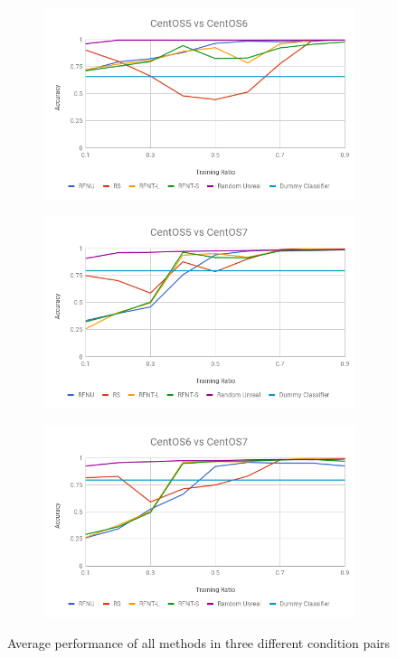 \documentclass[10pt, conference, compsocconf]{IEEEtran}
\begin{document}
\begin{figure}[h!]
        \centering
        \begin{subfigure}[b]{0.4\linewidth}
                \includegraphics[width=\columnwidth]{figures/simple-methods-5vs6}
        \end{subfigure}
        \begin{subfigure}[b]{0.4\linewidth}
		\includegraphics[width=\columnwidth]{figures/simple-methods-5vs7}
        \end{subfigure}
        \begin{subfigure}[b]{0.4\linewidth}
                \includegraphics[width=\columnwidth]{figures/simple-methods-6vs7}
        \end{subfigure}
	\caption{Average performance of all methods in three different condition pairs}
	\label{fig:simple-methods}
\end{figure}
\end{document}
